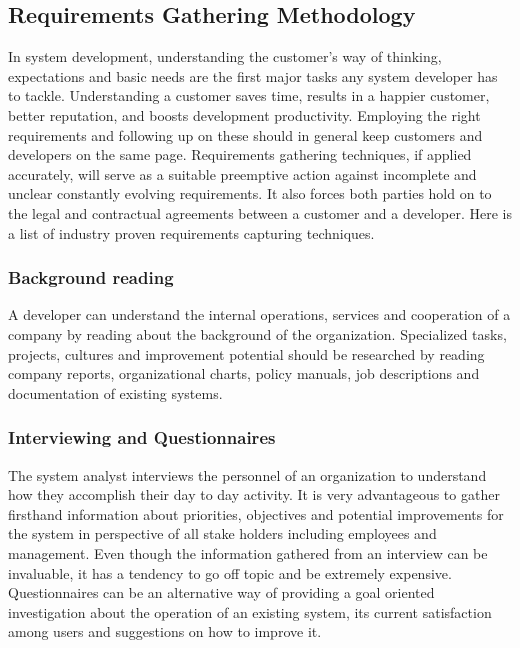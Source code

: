 \subsection{Requirements Gathering Methodology}

In system development, understanding the customer's way of thinking,
expectations and basic needs are the first major tasks any system developer has to
tackle. Understanding a customer saves time, results in a happier customer,
better reputation, and boosts development productivity. Employing the right
requirements and following up on these should in general keep customers and 
developers on the same page.
Requirements gathering techniques, if applied accurately, will serve as a
suitable preemptive action against incomplete and unclear constantly evolving
requirements. It also forces both parties hold on to the legal and
contractual agreements between a customer and a developer. Here is a list of
industry proven requirements capturing techniques.

\subsubsection{Background reading}

A developer can understand the internal operations, services and cooperation of
a company by reading about the background of the organization. Specialized
tasks, projects, cultures and improvement potential should be 
researched by reading company reports, organizational charts, policy manuals,
job descriptions and documentation of existing systems.

\subsubsection{Interviewing and Questionnaires}

The system analyst interviews the personnel of an organization to understand how
they accomplish their day to day activity. It is very advantageous to gather
firsthand information about priorities, objectives and potential improvements
for the system in perspective of all stake holders including employees and
management. Even though the information gathered from an
interview can be invaluable, it has a tendency to go off topic and be
extremely expensive. Questionnaires can be an alternative way of providing
a goal oriented investigation about the operation of an existing system, 
its current satisfaction among users and suggestions on how to improve it.

